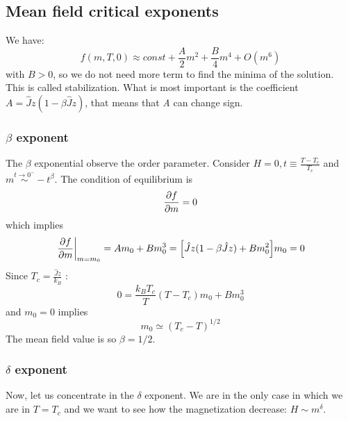 \documentclass[../main/main.tex]{subfiles}
\begin{document}

\subsection{Mean field critical exponents}
We have:
\begin{equation}
  f (m,T,0) \approx const + \frac{A}{2} m^2 + \frac{B}{4} m^4 + O(m^6)
\end{equation}
with \( B>0 \), so we do not need more term to find the minima of the solution. This is called stabilization. What is most important is  the coefficient \( A = \hat{J} z (1- \beta \hat{J} z ) \), that means that  \emph{A} can change sign.
\subsubsection{\( \beta  \) exponent}
The \( \beta  \) exponential observe the order parameter. Consider \( H=0, t \equiv \frac{T-T_c}{T_c} \) and \( m \overset{t \rightarrow 0^-}{\sim } -t^ \beta  \). The condition of equilibrium is
\begin{equation}
  \pdv{f}{m}=0
\end{equation}
which implies
\begin{equation}
  \eval{\pdv{f}{m} }_{m=m_0} = A m_0 + B m_0^3 = \qty[ \hat{J} z ( 1- \beta \hat{J} z ) + B m_0^2]m_0 = 0
\end{equation}
Since \( T_c = \frac{\hat{J}z }{k_B } \) :
\begin{equation}
  0 = \frac{k_B T_c}{T} (T-T_c) m_0 + B m_0^3
\end{equation}
and \( m_0=0 \) implies
\begin{equation}
  m_0 \simeq (T_c-T)^{1/2}
\end{equation}
The mean field value is so \( \beta =1/2 \).

\subsubsection{\( \delta  \) exponent}
Now, let us concentrate in the \( \delta  \) exponent. We are in the only case in which we are in \( T = T_c \) and we want to see how the magnetization decrease: \(  H \sim m^ \delta \).
\end{document}
